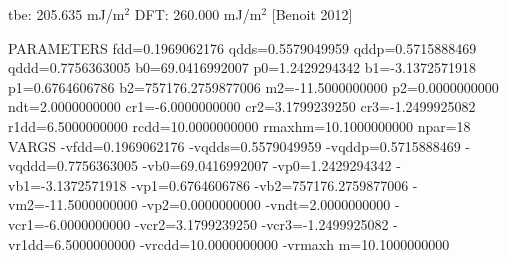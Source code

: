 \documentclass[11pt]{article}
\begin{document}
tbe:       205.635 mJ/m\(^{\text{2}}\)
DFT:       260.000 mJ/m\(^{\text{2}}\) [Benoit  2012]



PARAMETERS
  fdd=0.1969062176 qdds=0.5579049959 qddp=0.5715888469 qddd=0.7756363005 b0=69.0416992007 p0=1.2429294342 b1=-3.1372571918 p1=0.6764606786 b2=757176.2759877006 m2=-11.5000000000 p2=0.0000000000 ndt=2.0000000000 cr1=-6.0000000000 cr2=3.1799239250 cr3=-1.2499925082 r1dd=6.5000000000 rcdd=10.0000000000 rmaxhm=10.1000000000 npar=18 
VARGS
    -vfdd=0.1969062176 -vqdds=0.5579049959 -vqddp=0.5715888469 -vqddd=0.7756363005 -vb0=69.0416992007 -vp0=1.2429294342 -vb1=-3.1372571918 -vp1=0.6764606786 -vb2=757176.2759877006 -vm2=-11.5000000000 -vp2=0.0000000000 -vndt=2.0000000000 -vcr1=-6.0000000000 -vcr2=3.1799239250 -vcr3=-1.2499925082 -vr1dd=6.5000000000 -vrcdd=10.0000000000 -vrmaxh
m=10.1000000000 
\end{document}
